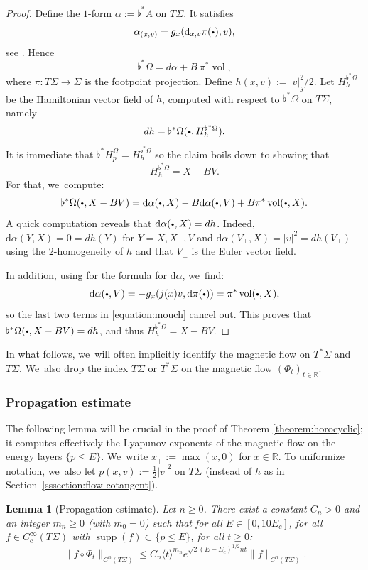 \documentclass[10pt]{amsart}
\newcommand{\sbullet}{{\scriptscriptstyle\bullet}}
\newcommand{\csbullet}{{\raisebox{1pt}{$\sbullet$}}}
\theoremstyle{plain}
\newtheorem{lemma}[theorem]{Lemma}
\theoremstyle{definition}
\newcommand{\R}{\mathbb{R}}
\newcommand{\dd}{\mathrm{d}}
\DeclareMathOperator{\comp}{c}
\DeclareMathOperator{\supp}{supp}
\DeclareMathOperator{\vol}{vol}
\begin{document}
\begin{proof}
Define the $1$-form $\alpha := \flat^*A$ on $T\Sigma$. It satisfies
\[
\alpha_{(x,v)} = g_x(\dd_{x,v}\pi(\csbullet),v),
\]
see \cite[Lem.\,1.37, item\,1]{Paternain-99}. Hence
\[
\flat^*\Omega = d\alpha + B~ \pi^*\vol,
\]
where $\pi : T\Sigma \to \Sigma$ is the footpoint projection. Define $h(x,v) := |v|^2_g/2$. Let $H_h^{\flat^*\Omega}$ be the Hamiltonian vector field of $h$, computed with respect to $\flat^*\Omega$ on $T\Sigma$, namely
\[
dh = \flat^*\Omega(\csbullet, H_h^{\flat^*\Omega}).
\]
It is immediate that $\flat^* H_p^{\Omega} = H_h^{\flat^*\Omega}$ so the claim boils down to showing that
\[
H_h^{\flat^*\Omega} = X - B V.
\]
For that, we~compute:
\begin{equation}
\label{equation:mouch}
\flat^*\Omega(\csbullet,X-BV) = \dd\alpha(\csbullet, X) - B \dd \alpha(\csbullet, V) + B \pi^*\vol(\csbullet, X).
\end{equation}
A quick computation reveals that $\dd \alpha(\csbullet, X) = dh$. Indeed, $\dd \alpha(Y,X) = 0 = dh(Y)$ for $Y = X,X_\perp,V$ and $\dd \alpha(V_\perp,X) = |v|^2 = dh(V_\perp)$ using the $2$-homogeneity of $h$ and that $V_\perp$ is the Euler vector field.

In addition, using \cite[Prop.\,1.24]{Paternain-99} for the formula for $\dd \alpha$, we~find:
\[
\dd \alpha(\csbullet,V) = - g_x(j(x)v, \dd \pi(\csbullet)) = \pi^*\vol(\csbullet,X),
\]
so the last two terms in \eqref{equation:mouch} cancel out. This proves that $\flat^*\Omega(\csbullet,X-BV) = dh$, and thus $H_h^{\flat^*\Omega} = X - B V$.
\end{proof}

In what follows, we~will often implicitly identify the magnetic flow on $T^*\Sigma$ and $T\Sigma$. We~also drop the index $T\Sigma$ or $T^*\Sigma$ on the magnetic flow $(\Phi_t)_{t \in \R}$.

\subsubsection{Propagation estimate}
The following lemma will be crucial in the proof of Theorem \ref{theorem:horocyclic}; it computes effectively the Lyapunov exponents of the magnetic flow on the energy layers $\{p \leq E\}$. We~write $x_+ := \max(x,0)$ for $x \in \R$. To uniformize notation, we~also let $p(x,v) := \tfrac{1}{2}|v|^2$ on $T\Sigma$ (instead of $h$ as in Section~\ref{sssection:flow-cotangent}).

\begin{lemma}[Propagation estimate]
\label{lemma:wow}
Let $n \geq 0$. There exist a constant $C_n > 0$ and an integer $m_n \geq 0$ (with $m_0 = 0$) such that for all $E \in [0,10E_c]$, for all $f \in C^\infty_{\comp}(T\Sigma)$ with $\supp(f) \subset \{p \leq E\}$, for all $t \geq 0$:
\begin{equation}
\label{equation:key-bound}
\|f \circ \Phi_t\|_{C^n(T\Sigma)} \leq C_n \langle t \rangle^{m_n} e^{\sqrt{2}(E-E_c)_+^{1/2}n t}\|f\|_{C^n(T\Sigma)}.
\end{equation}
\end{lemma}
\end{document}
